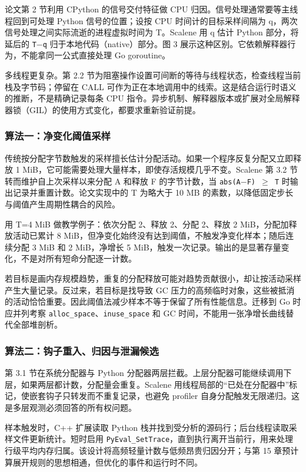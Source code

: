 \documentclass[UTF8,fontset=fandol,openany,11pt]{ctexbook}
\begin{document}
论文第 2 节利用 CPython 的信号交付特征做 CPU 归因。信号处理通常要等主线程回到可处理 Python 信号的位置；设按 CPU 时间计的目标采样间隔为 q，两次信号处理之间实际流逝的进程虚拟时间为 T。Scalene 用 q 估计 Python 部分，将延后的 \texttt{T\ensuremath{-}q} 归于本地代码（native）部分。图 3 展示这种区别。它依赖解释器行为，不能拿同一公式直接处理 Go goroutine。

多线程更复杂。第 2.2 节为阻塞操作设置可间断的等待与线程状态，检查线程当前栈及字节码；停留在 CALL 可作为正在本地调用中的线索。这是结合运行时语义的推断，不是精确记录每条 CPU 指令。异步机制、解释器版本或扩展对全局解释器锁（GIL）的使用方式变化，都要求重新验证前提。

\subsubsection{算法一：净变化阈值采样}
传统按分配字节数触发的采样擅长估计分配活动。如果一个程序反复分配又立即释放 1 MiB，它可能需要处理大量样本，即使存活规模几乎不变。Scalene 第 3.2 节转而维护自上次采样以来分配 A 和释放 F 的字节计数，当 \texttt{abs(A\ensuremath{-}F) \ensuremath{\geq} T} 时输出记录并重置计数。论文实现中的 T 为略大于 10 MB 的素数，以降低固定步长与阈值产生周期性耦合的风险。

用 T=4 MiB 做教学例子：依次分配 2、释放 2、分配 2、释放 2 MiB，分配加释放活动已累计 8 MiB，但净变化始终没有达到阈值，不触发净变化样本；随后连续分配 3 MiB 和 2 MiB，净增长 5 MiB，触发一次记录。输出的是显著存量变化，不是对所有短命分配逐一计数。

若目标是画内存规模趋势，重复的分配释放可能对趋势贡献很小，却让按活动采样产生大量记录。反过来，若目标是找导致 GC 压力的高频临时对象，这些被抵消的活动恰恰重要。因此阈值法减少样本不等于保留了所有性能信息。迁移到 Go 时应并列考察 \texttt{alloc\_\allowbreak{}space}、\texttt{inuse\_\allowbreak{}space} 和 GC 时间，不能用一张净增长曲线替代全部堆剖析。

\subsubsection{算法二：钩子重入、归因与泄漏候选}
第 3.1 节在系统分配器与 Python 分配器两层拦截。上层分配器可能继续调用下层，如果两层都计数，分配量会重复。Scalene 用线程局部的“已处在分配器中”标记，使嵌套钩子只转发而不重复记录，也避免 profiler 自身分配触发无限递归。这是多层观测必须回答的所有权问题。

样本触发时，C++ 扩展读取 Python 栈并找到受分析的源码行；后台线程读取采样文件更新统计。短时启用 \texttt{PyEval\_\allowbreak{}SetTrace}，直到执行离开当前行，用来处理行级平均内存归属。该设计将高频轻量计数与低频昂贵归因分开；与第 15 章预计算展开规则的思想相通，但优化的事件和运行时不同。
\end{document}

